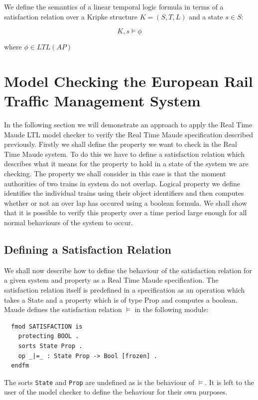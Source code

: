 \begin{mydef}
We define the semantics of a linear temporal logic formula in terms of a satisfaction relation over a Kripke structure $K = (S,T,L)$ and a state $s \in S$:

$$K,s \models \phi$$

where $\phi \in LTL(AP)$

\end{mydef}





\section{Model Checking the European Rail Traffic Management System}
In the following section we will demonstrate an approach to apply the Real Time Maude LTL model checker to verify the Real Time Maude specification described previously.
Firstly we shall define the property we want to check in the Real Time Maude system. To do this we have to define a satisfaction relation which describes what it means for the property to hold in a state of the system we are checking.  The property we shall consider in this case is that the moment authorities of two trains in system do not overlap. Logical property we define identifies the individual trains using their object identifiers and then computes whether or not an over lap has occured using a boolean formula.  We shall show that it is possible to verify this property over a time period large enough for all normal behaviours of the system to occur. 

\subsection*{Defining a Satisfaction Relation}
We shall now describe how to define the behaviour of the satisfaction relation for a given system and property as a Real Time Maude specification. The satisfaction relation itself is predefined in a specification as an operation which takes a State and a property which is of type Prop and computes a boolean. Maude defines the satisfaction relation $\models$ in the following module:
\begin{verbatim}
  fmod SATISFACTION is  
    protecting BOOL .  
    sorts State Prop .  
    op _|=_ : State Prop -> Bool [frozen] .  
  endfm
\end{verbatim}
The sorts \texttt{State} and \texttt{Prop} are undefined as is the behaviour of $\models$. It is left to the user of the model checker to define the behaviour for their own purposes.

